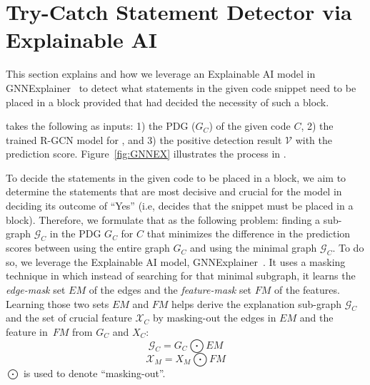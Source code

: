 \section{Try-Catch Statement Detector via Explainable AI}
\label{interpretation:sec}

This section explains {\xstate} and how we leverage an Explainable AI
model in GNNExplainer~\cite{GNNExplainer} to detect what statements in
the given code snippet need to be placed in a  block
provided that {\xblock} had decided the necessity of such a block.

{\xstate} takes the following as inputs: 1) the PDG ($G_C$) of the
given code $C$, 2) the trained R-GCN model for {\xblock}, and 3) the
positive detection result $\mathcal{V}$ with the prediction score.
Figure~\ref{fig:GNNEX} illustrates the process in {\xstate}.






To decide the statements in the given code to be placed in a
 block, we aim to determine the statements that are
most decisive and crucial for the {\xblock} model in deciding its
outcome of ``Yes'' (i.e, {\xblock} decides that the snippet must be
placed in a  block). Therefore, we formulate that as
the following problem: finding a sub-graph $\mathcal{G}_C$ in the PDG
$G_C$ for $C$ that minimizes the difference in the prediction scores
between using the entire graph $G_C$ and using the minimal graph
$\mathcal{G}_C$. To do so, we leverage the Explainable AI model,
GNNExplainer~\cite{GNNExplainer}. It uses a masking technique in which
instead of searching for that minimal subgraph, it learns the {\em
  edge-mask} set $EM$ of the edges and the {\em feature-mask} set $FM$
of the features. Learning those two sets $EM$ and $FM$ helps derive
the explanation sub-graph $\mathcal{G}_C$ and the set of crucial
feature $\mathcal{X}_C$ by masking-out the edges in $EM$ and the
feature in~$FM$ from $G_C$ and $X_C$:
\begin{equation}\label{eq:11}
\mathcal{G}_C = G_C \bigodot EM
\end{equation}
\begin{equation}\label{eq:12}
\mathcal{X}_M = X_M \bigodot FM
\end{equation}
$\bigodot$ is used to denote ``masking-out''.


